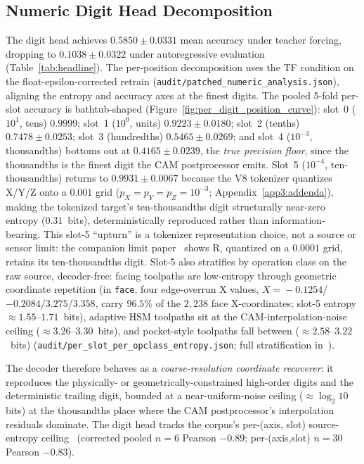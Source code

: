\documentclass[sensors,article,submit,moreauthors,pdftex]{Definitions/mdpi}
\begin{document}
\subsection{Numeric Digit Head Decomposition}
\label{sec:numeric-decomposition}

The digit head achieves $0.5850 \pm 0.0331$ mean accuracy under teacher forcing, dropping to $0.1038 \pm 0.0322$ under autoregressive evaluation (Table~\ref{tab:headline}). The per-position decomposition uses the TF condition on the float-epsilon-corrected retrain (\texttt{audit/patched\_numeric\_analysis.json}), aligning the entropy and accuracy axes at the finest digits. The pooled 5-fold per-slot accuracy is bathtub-shaped (Figure~\ref{fig:per_digit_position_curve}): slot~0 ($10^{1}$, tens) $0.9999$; slot~1 ($10^{0}$, units) $0.9223 \pm 0.0180$; slot~2 (tenths) $0.7478 \pm 0.0253$; slot~3 (hundredths) $0.5465 \pm 0.0269$; and slot~4 ($10^{-3}$, thousandths) bottoms out at $0.4165 \pm 0.0239$, the \emph{true precision floor}, since the thousandths is the finest digit the CAM postprocessor emits. Slot~5 ($10^{-4}$, ten-thousandths) returns to $0.9931 \pm 0.0067$ because the V8 tokenizer quantizes X/Y/Z onto a $0.001$ grid ($p_X\!=\!p_Y\!=\!p_Z\!=\!10^{-3}$; Appendix~\ref{app3:addenda}), making the tokenized target's ten-thousandths digit structurally near-zero entropy ($0.31$~bits), deterministically reproduced rather than information-bearing. This slot-5 ``upturn'' is a tokenizer representation choice, not a source or sensor limit: the companion limit paper~\cite{paperB_entropy} shows R, quantized on a $0.0001$ grid, retains its ten-thousandths digit. Slot-5 also stratifies by operation class on the raw source, decoder-free: facing toolpaths are low-entropy through geometric coordinate repetition (in \texttt{face}, four edge-overrun X values, $X\!=\!-0.1254$/$-0.2084$/$3.275$/$3.358$, carry $96.5\%$ of the $2{,}238$ face X-coordinates; slot-5 entropy $\approx\!1.55$--$1.71$~bits), adaptive HSM toolpaths sit at the CAM-interpolation-noise ceiling ($\approx\!3.26$--$3.30$~bits), and pocket-style toolpaths fall between ($\approx\!2.58$--$3.22$~bits) (\texttt{audit/per\_slot\_per\_opclass\_entropy.json}; full stratification in~\cite{paperB_entropy}).

The decoder therefore behaves as a \emph{coarse-resolution coordinate recoverer}: it reproduces the physically- or geometrically-constrained high-order digits and the deterministic trailing digit, bounded at a near-uniform-noise ceiling ($\approx\!\log_2 10$ bits) at the thousandths place where the CAM postprocessor's interpolation residuals dominate. The digit head tracks the corpus's per-(axis, slot) source-entropy ceiling~\cite{paperB_entropy} (corrected pooled $n\!=\!6$ Pearson $-0.89$; per-(axis,slot) $n\!=\!30$ Pearson $-0.83$).
\end{document}
